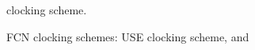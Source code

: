 \documentclass{article}
\begin{document}
\begin{figure}
\centering
\begin{subcaptiongroup}
\label{fig:use-cs}
 
\label{fig:2dd-cs}

\end{subcaptiongroup}
\captionsetup{subrefformat=parens}
\caption{FCN clocking schemes:  USE clocking scheme, and } clocking scheme.
\end{figure}
\end{document}
